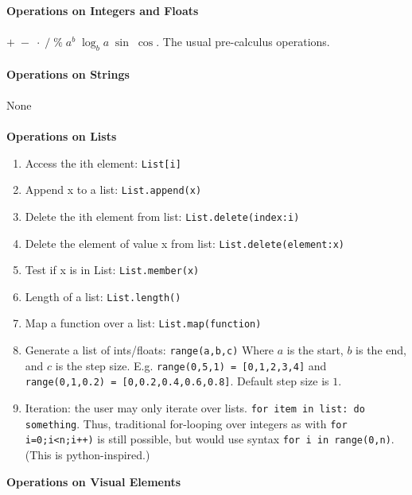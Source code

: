 \documentclass[12pt]{article}
\theoremstyle{remark}
\newcommand{\ttt}[1]{\texttt{#1}}
\begin{document}
\textbf{Operations on Integers and Floats}
\\\\
$+ \; - \;  \cdot  \; / \; \% \; a^b \; \log_b a \; \sin \; \cos$. The usual pre-calculus operations.
\\\\
\textbf{Operations on Strings}
\\\\
None
\\\\
\textbf{Operations on Lists}
\begin{enumerate}
\item Access the ith element: \ttt{List[i]}
\item Append x to a list: \ttt{List.append(x)}
\item Delete the ith element from list: \ttt{List.delete(index:i)}
\item Delete the element of value x from list: \ttt{List.delete(element:x)}
\item Test if x is in List: \ttt{List.member(x)}
\item Length of a list: \ttt{List.length()}
\item Map a function over a list: \ttt{List.map(function)}
\item Generate a list of ints/floats: \ttt{range(a,b,c)} Where $a$ is the start, $b$ is the end, and $c$ is the step size. E.g. \ttt{range(0,5,1) = [0,1,2,3,4]} and \\ \ttt{range(0,1,0.2) = [0,0.2,0.4,0.6,0.8]}. Default step size is $1$.
\item Iteration: the user may only iterate over lists. \ttt{for item in list: do something}. Thus, traditional for-looping over integers as with \ttt{for i=0;i<n;i++)} is still possible, but would use syntax \ttt{for i in range(0,n)}. (This is python-inspired.)
\end{enumerate}
\textbf{Operations on Visual Elements}
\end{document}
